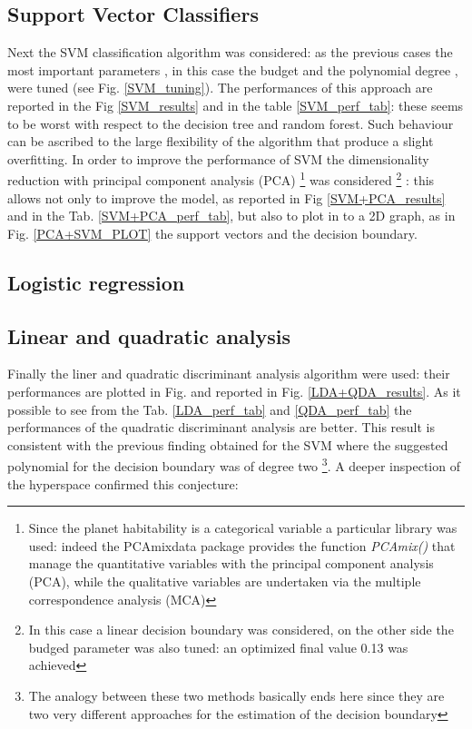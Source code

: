 \documentclass[
12pt, %
a4paper, %
oneside, %
headinclude,footinclude, %
BCOR5mm, %
]{scrartcl}
\begin{document}
\subsection{Support Vector Classifiers}
Next the SVM classification algorithm was considered: as the previous cases the most important parameters , in this case the budget and the polynomial degree , were tuned (see Fig. \ref{SVM_tuning}). The performances of this approach are reported in the Fig \ref{SVM_results} and in the table \ref{SVM_perf_tab}: these seems to be worst with respect to the decision tree and random forest. Such behaviour can be ascribed to the large flexibility of the algorithm that produce a slight overfitting. In order to improve the performance of SVM the dimensionality reduction with principal component analysis (PCA) \footnote{Since the planet habitability is a categorical variable a particular library was used: indeed the PCAmixdata package provides the function \textit{PCAmix()} that manage the quantitative variables with the principal component analysis (PCA), while the qualitative variables are undertaken via the multiple correspondence analysis (MCA)} was considered \footnote{In this case a linear decision boundary was considered, on the other side the budged parameter was also tuned: an optimized final value 0.13 was achieved} : this allows not only to improve the model, as reported in Fig \ref{SVM+PCA_results} and in the Tab. \ref{SVM+PCA_perf_tab}, but also to plot in to a 2D graph, as in Fig. \ref{PCA+SVM_PLOT} the support vectors and the decision boundary. 



\subsection{Logistic regression}



\subsection{Linear and quadratic analysis}
Finally the liner and quadratic discriminant analysis algorithm were used: their performances are plotted in Fig. and reported in Fig. \ref{LDA+QDA_results}. As it possible to see from the Tab. \ref{LDA_perf_tab} and \ref{QDA_perf_tab} the performances of the quadratic discriminant analysis are better. This result is consistent with the previous finding obtained for the SVM where the suggested polynomial for the decision boundary was of degree two \footnote{The analogy between these two methods basically ends here since they are two very different approaches for the estimation of the decision boundary}. A deeper inspection of the hyperspace confirmed this conjecture: 
\end{document}

